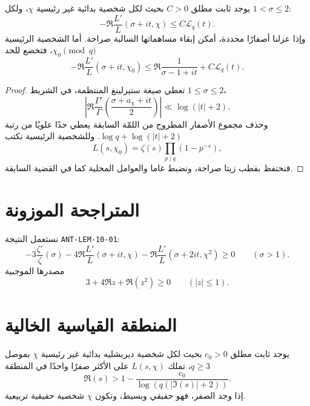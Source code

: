 \begin{lemma}
\label{lem:chapter11-uniform-remainder}
\provedhere
يوجد ثابت مطلق \(C>0\) بحيث لكل شخصية بدائية غير رئيسية \(\chi\)، ولكل
\(1<\sigma\le2\):
\[
-\Re\frac{L'}{L}(\sigma+it,\chi)
\le C\mathcal L_q(t).
\]
وإذا عزلنا أصفارًا محددة، أمكن إبقاء مساهماتها السالبة صراحة. أما الشخصية
الرئيسية \(\chi_0\pmod q\)، فتخضع للحد
\[
-\Re\frac{L'}{L}(\sigma+it,\chi_0)
\le \Re\frac1{\sigma-1+it}+C\mathcal L_q(t).
\]
\end{lemma}

\begin{proof}
تعطي صيغة ستيرلينغ المنتظمة، في الشريط \(1\le\sigma\le2\)،
\[
\left|
\Re\frac{\Gamma'}{\Gamma}
\!\left(\frac{\sigma+a_\chi+it}{2}\right)
\right|\ll\log(|t|+2).
\]
وحذف مجموع الأصفار المطروح من اللمّة السابقة يعطي حدًا علويًا من رتبة
\(\log q+\log(|t|+2)\). وللشخصية الرئيسية نكتب
\[
L(s,\chi_0)=\zeta(s)\prod_{p\mid q}(1-p^{-s}),
\]
فنحتفظ بقطب زيتا صراحة، ونضبط غاما والعوامل المحلية كما في القضية السابقة.
\end{proof}

\section{المتراجحة الموزونة}

نستعمل النتيجة \textenglish{\texttt{ANT-LEM-10-01}}:
\[
-3\frac{\zeta'}{\zeta}(\sigma)
-4\Re\frac{L'}{L}(\sigma+it,\chi)
-\Re\frac{L'}{L}(\sigma+2it,\chi^2)
\ge0
\qquad(\sigma>1).
\tag{11.1}
\]
مصدرها الموجبية
\[
3+4\Re z+\Re(z^2)\ge0
\qquad(|z|\le1).
\]

\section{المنطقة القياسية الخالية}

\begin{theorem}
\label{thm:chapter11-standard-zero-free-region}
\provedhere
يوجد ثابت مطلق \(c_0>0\) بحيث لكل شخصية ديريشليه بدائية غير رئيسية
\(\chi\) بموصل \(q\ge3\)، تملك \(L(s,\chi)\) على الأكثر صفرًا واحدًا في
المنطقة
\[
\Re(s)>
1-\frac{c_0}{\log(q(|\Im(s)|+2))}.
\tag{11.2}
\]
إذا وجد الصفر، فهو حقيقي وبسيط، وتكون \(\chi\) شخصية حقيقية تربيعية.
\end{theorem}

